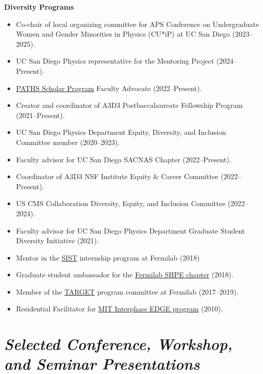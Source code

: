 \documentclass[11pt]{res}
\newcommand{\MarginText}[1]{\section{\textit{#1}}}
\begin{document}
\begin{resume}
  \textbf{Diversity Programs}
  \begin{itemize}
    \itemsep-0.3em
    \item Co-chair of local organizing committee for APS Conference on Undergraduate Women and Gender Minorities in Physics (CU*iP) at UC San Diego (2023--2025).
    \item UC San Diego Physics representative for the Mentoring Project (2024--Present).
    \item \href{https://paths.ucsd.edu/index.html}{PATHS Scholar Program} Faculty Advocate (2022--Present).
    \item Creator and coordinator of A3D3 Postbaccalaureate Fellowship Program (2021--Present).
    \item UC San Diego Physics Department Equity, Diversity, and Inclusion Committee member ({2020--2023}).
    \item Faculty advisor for UC San Diego SACNAS Chapter ({2022--Present}).
    \item Coordinator of A3D3 NSF Institute Equity \& Career Committee ({2022--Present}).
    \item US CMS Collaboration Diversity, Equity, and Inclusion Committee ({2022--2024}).
    \item Faculty advisor for UC San Diego Physics Department Graduate Student Diversity Initiative ({2021}).
    \item Mentor in the \href{http://diversity.fnal.gov/sist/}{SIST} internship program at Fermilab ({2018})
    \item Graduate student ambassador for the \href{http://diversity.fnal.gov/fshpe/}{Fermilab SHPE chapter} ({2018}).
    \item Member of the \href{http://diversity.fnal.gov/target/}{TARGET} program committee at Fermilab ({2017--2019}).
    \item Residential Facilitator for \href{http://ome.mit.edu/programs-services/program-overview}{MIT Interphase EDGE program} ({2010}).
  \end{itemize}


  \MarginText{Selected Conference, Workshop, and Seminar Presentations}


\end{resume}
\end{document}
